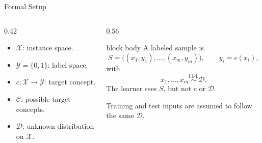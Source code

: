 \documentclass[aspectratio=169,10pt]{beamer}
\newcommand{\X}{\mathcal{X}}
\newcommand{\Y}{\mathcal{Y}}
\newcommand{\D}{\mathcal{D}}
\newcommand{\C}{\mathcal{C}}
\begin{document}
\begin{frame}[t]{Formal Setup}
  \vspace{0.02cm}
  \begin{columns}[T,totalwidth=\textwidth]
    \begin{column}{0.42\textwidth}
      \begin{itemize}
        \setlength{\itemsep}{0.20cm}
        \item $\X$: instance space.
        \item $\Y=\{0,1\}$: label space.
        \item $c:\X\to\Y$: target concept.
        \item $\C$: possible target concepts.
        \item $\D$: unknown distribution on $\X$.
      \end{itemize}
    \end{column}
    \begin{column}{0.56\textwidth}
      \begin{beamercolorbox}[rounded=true,sep=0.20cm,wd=\linewidth]{block body}
        A labeled sample is
        \[
          S=\bigl((x_1,y_1),\ldots,(x_m,y_m)\bigr),
          \qquad y_i=c(x_i),
        \]
        with
        \[
          x_1,\ldots,x_m\overset{\mathrm{i.i.d.}}{\sim}\D.
        \]
        The learner sees $S$, but not $c$ or $\D$.
      \end{beamercolorbox}
      \vspace{0.18cm}
      Training and test inputs are assumed to follow the same $\D$.
    \end{column}
  \end{columns}
\end{frame}
\end{document}
